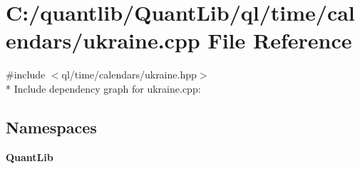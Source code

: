 \section{C\+:/quantlib/\+Quant\+Lib/ql/time/calendars/ukraine.cpp File Reference}
\label{ukraine_8cpp}
{\ttfamily \#include $<$ql/time/calendars/ukraine.\+hpp$>$}\\*
Include dependency graph for ukraine.\+cpp\+:
\subsection*{Namespaces}
\begin{DoxyCompactItemize}
\item 
 {\bf Quant\+Lib}
\end{DoxyCompactItemize}

